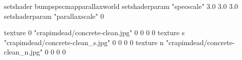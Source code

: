 setshader bumpspecmapparallaxworld
setshaderparam "specscale" 3.0 3.0 3.0
setshaderparam "parallaxscale" 0

texture 0 "crapimdead/concrete-clean.jpg" 0 0 0 0
texture s "crapimdead/concrete-clean_s.jpg" 0 0 0 0
texture n "crapimdead/concrete-clean_n.jpg" 0 0 0 0


